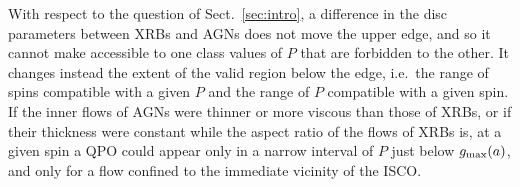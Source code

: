With respect to the question of Sect.~\ref{sec:intro}, a difference in the disc parameters between XRBs and AGNs does not move the upper edge, and so it cannot make accessible to one class values of $P$ that are forbidden to the other.
It changes instead the extent of the valid region below the edge, i.e.\ the range of spins compatible with a given $P$ and the range of $P$ compatible with a given spin.
If the inner flows of AGNs were thinner or more viscous than those of XRBs, or if their thickness were constant while the aspect ratio of the flows of XRBs is, at a given spin a QPO could appear only in a narrow interval of $P$ just below $g_\textup{max}(a)$, and only for a flow confined to the immediate vicinity of the ISCO.
